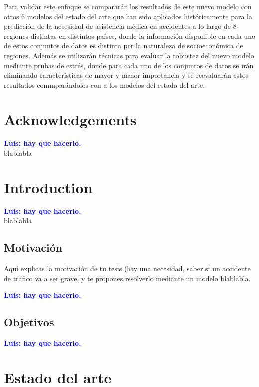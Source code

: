 \documentclass{uathesis-es}
\begin{document}
Para validar este enfoque se compararán los resultados de este nuevo modelo con otros 6 modelos del estado del arte que han sido aplicados históricamente para la predicción de la necesidad de asistencia médica en accidentes a lo largo de 8 regiones distintas en distintos países, donde la información disponible en cada uno de estos conjuntos de datos es distinta por la naturaleza de socioeconómica de regiones. Además se utilizarán técnicas para evaluar la robustez del nuevo modelo mediante prubas de estrés, donde para cada uno de los conjuntos de datos se irán eliminando características de mayor y menor importancia y se reevaluarán estos resultados commparándolos con a los modelos del estado del arte.

\chapter*{Acknowledgements}
\addtocounter{chapter}{0}

\textcolor{blue}{\textbf{Luis: hay que hacerlo.}}\\

blablabla

\chapter{Introduction}

\textcolor{blue}{\textbf{Luis: hay que hacerlo.}}\\


blablabla

\section{Motivación}
Aquí explicas la motivación de tu tesis (hay una necesidad, saber si un accidente de trafico va a ser grave, y te propones resolverlo mediante un modelo blablabla.

\textcolor{blue}{\textbf{Luis: hay que hacerlo.}}\\


\section{Objetivos}
\textcolor{blue}{\textbf{Luis: hay que hacerlo.}}\\


\chapter{Estado del arte}
\end{document}

